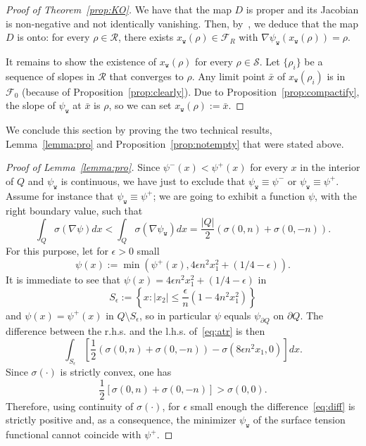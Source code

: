 \documentclass[10pt]{amsart}
\theoremstyle{definition}\newtheorem{defi}[theo]{Definition}\newtheorem{rema}[theo]{Remark}\newtheorem{exam}[theo]{Example}\newtheorem{exem}[theo]{Example}\newtheorem{nota}[theo]{Notation}
\newcommand{\psiw}{\psi_{\mathtt w}}
\newcommand{\ttw}{\mathtt{w}}
\newcommand{\clS}{\mathcal{S}}
\newcommand{\clR}{\mathcal{R}}
\newcommand{\clF}{\mathcal{F}}
\begin{document}
\begin{proof}[Proof of Theorem~\ref{prop:KO}]
We have that the map $D$ is proper and its Jacobian is non-negative and not identically vanishing. Then, by~\cite[Theorem~1]{nijenhuis1962theorem}, we deduce that the map $D$ is onto: for every $\rho\in \clR$, there exists $x_{\ttw}(\rho)\in \clF_R$ with $\nabla \psi_{\ttw}(x_{\ttw}(\rho))=\rho$.



It remains to show the existence of $x_{\ttw}(\rho)$ for every $\rho\in \clS$. Let $\{\rho_i\}$ be a sequence of slopes in $\clR$ that converges to $\rho$. Any limit point $\bar x$ of $x_{\ttw}(\rho_i)$ is in $\clF_0$ (because of Proposition~\ref{prop:clearly}). Due to Proposition~\ref{prop:compactify}, the slope of $\psiw$ at $\bar x$ is $\rho$, so we can set $x_{\ttw}(\rho):=\bar x$.
\end{proof}

We conclude this section by proving the two technical results, Lemma~\ref{lemma:pro} and Proposition~\ref{prop:notempty} that were stated above.

\begin{proof}[Proof of Lemma~\ref{lemma:pro}]
Since $\psi^-(x)<\psi^+(x)$ for every $x$ in the interior of $Q$ and $\psi_{\ttw}$ is continuous, we have just to exclude that $\psi_{\ttw}\equiv \psi^-$ or $\psi_{\ttw}\equiv \psi^+$. Assume for instance that $\psi_{\ttw}\equiv \psi^+$; we are going to exhibit a function $\psi$, with the right boundary value, such that
\begin{equation}\label{eq:atr}
\int_Q \sigma(\nabla\psi)dx<\int_Q\sigma(\nabla\psi_{\ttw})d x=\frac{|Q|}2(\sigma(0,n)+\sigma(0,- n)).
\end{equation}
For this purpose, let for $\epsilon>0$ small
\[
\psi(x):=\min\left(\psi^+(x),4 \epsilon n^2 x_1^2+(1/4-\epsilon)\right).
\]
It is immediate to see that $\psi(x)=4\epsilon n^2 x_1^2+(1/4-\epsilon)$ in
\[
S_\epsilon:=\left\{x:|x_2|\le \frac{\epsilon}{n} \left(1-4n^2 x_1^2\right)\right\}
\]
and $\psi(x)=\psi^+(x)$ in $Q\setminus S_\epsilon$, so in particular $\psi$ equals $\psi_{\partial Q}$ on $\partial Q$. The difference between the r.h.s. and the l.h.s. of~\eqref{eq:atr} is then
\begin{equation}\label{eq:diff}
\int_{S_\epsilon}\left[\frac12\left(\sigma(0,n)+\sigma(0,-n)\right)-\sigma\left(8 \epsilon n^2 x_1,0\right)\right]dx.
\end{equation}
Since $\sigma(\cdot)$ is strictly convex, one has
\[
\frac12\left[\sigma(0,n)+\sigma(0,-n)\right]>\sigma(0,0).
\]
Therefore, using continuity of $\sigma(\cdot)$, for $\epsilon$ small enough the difference~\eqref{eq:diff} is strictly positive and, as a consequence, the minimizer $\psi_{\ttw}$ of the surface tension functional cannot coincide with $\psi^+$.
\end{proof}
\end{document}
